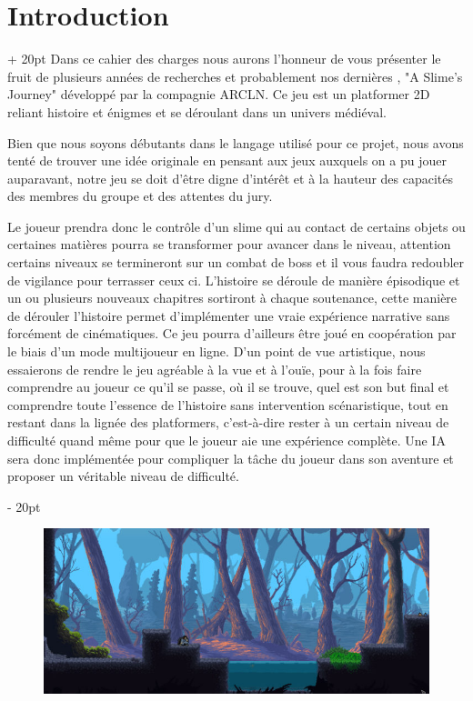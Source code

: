 \documentclass[a4paper, 12pt, twoside]{article}
\newcommand{\ind}[1][20pt]{\advance\leftskip + #1}
\newcommand{\deind}[1][20pt]{\advance\leftskip - #1}
\newenvironment{indt}[2][20pt]{#2 \par \ind[#1]}{\par \deind} %
\begin{document}
    

    \tableofcontents
    \newpage

    \begin{indt}{\section{Introduction}}
        Dans ce cahier des charges nous aurons l'honneur de vous présenter le fruit de plusieurs années de recherches et probablement nos dernières , "A Slime's Journey" développé par la compagnie ARCLN. Ce jeu est un platformer 2D reliant histoire et énigmes et se déroulant dans un univers médiéval.

        Bien que nous soyons débutants dans le langage utilisé pour ce projet, nous avons tenté de trouver une idée originale en pensant aux jeux auxquels on a pu jouer auparavant, notre jeu se doit d'être digne d'intérêt et à la hauteur des capacités des membres du groupe et des attentes du jury.

        Le joueur prendra donc le contrôle d'un slime qui au contact de certains objets ou certaines matières pourra se transformer pour avancer dans le niveau, attention certains niveaux se termineront sur un combat de boss et il vous faudra redoubler de vigilance pour terrasser ceux ci. L'histoire se déroule de manière épisodique et un ou plusieurs nouveaux chapitres sortiront à chaque soutenance, cette manière de dérouler l'histoire permet d'implémenter une vraie expérience narrative sans forcément de cinématiques. Ce jeu pourra d'ailleurs être joué en coopération par le biais d'un mode multijoueur en ligne. D'un point de vue artistique, nous essaierons de rendre le jeu agréable à la vue et à l'ouïe, pour à la fois faire comprendre au joueur ce qu'il se passe, où il se trouve, quel est son but final et comprendre toute l'essence de l'histoire sans intervention scénaristique, tout en restant dans la lignée des platformers, c'est-à-dire rester à un certain niveau de difficulté quand même pour que le joueur aie une expérience complète. Une IA sera donc implémentée pour compliquer la tâche du joueur dans son aventure et proposer un véritable niveau de difficulté.
    \end{indt}

    \vspace{24pt}

    \begin{figure}[h!]
        \includegraphics[width=\linewidth]{forest.png}
    \end{figure}
    
\end{document}
